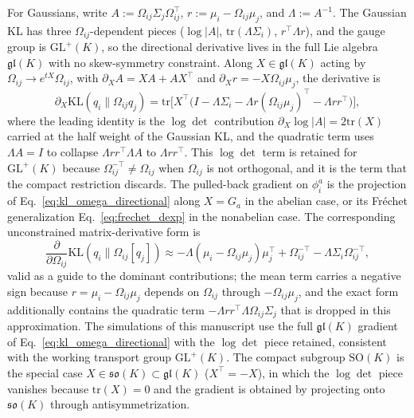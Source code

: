 \documentclass[11pt]{article}
\begin{document}
For Gaussians, write $A := \Omega_{ij}\Sigma_j\Omega_{ij}^\top$, $r := \mu_i - \Omega_{ij}\mu_j$, and $\Lambda := A^{-1}$. The Gaussian KL has three $\Omega_{ij}$-dependent pieces ($\log|A|$, $\mathrm{tr}(\Lambda\Sigma_i)$, $r^\top\Lambda r$), and the gauge group is $\mathrm{GL}^+(K)$, so the directional derivative lives in the full Lie algebra $\mathfrak{gl}(K)$ with no skew-symmetry constraint. Along $X \in \mathfrak{gl}(K)$ acting by $\Omega_{ij} \to e^{tX}\Omega_{ij}$, with $\partial_X A = XA + AX^\top$ and $\partial_X r = -X\Omega_{ij}\mu_j$, the derivative is
\begin{equation}
\partial_X\mathrm{KL}(q_i\|\Omega_{ij}q_j) = \mathrm{tr}\Big[X^\top\Big(I - \Lambda\Sigma_i - \Lambda r(\Omega_{ij}\mu_j)^\top - \Lambda r r^\top\Big)\Big],
\label{eq:kl_omega_directional}
\end{equation}
where the leading identity is the $\log\det$ contribution $\partial_X\log|A| = 2\mathrm{tr}(X)$ carried at the half weight of the Gaussian KL, and the quadratic term uses $\Lambda A = I$ to collapse $\Lambda r r^\top\Lambda A$ to $\Lambda r r^\top$. This $\log\det$ term is retained for $\mathrm{GL}^+(K)$ because $\Omega_{ij}^{-\top} \neq \Omega_{ij}$ when $\Omega_{ij}$ is not orthogonal, and it is the term that the compact restriction discards. The pulled-back gradient on $\phi_i^a$ is the projection of Eq.~\eqref{eq:kl_omega_directional} along $X = G_a$ in the abelian case, or its Fr\'echet generalization Eq.~\eqref{eq:frechet_dexp} in the nonabelian case. The corresponding unconstrained matrix-derivative form is
\begin{equation}
\frac{\partial}{\partial \Omega_{ij}}\mathrm{KL}(q_i \| \Omega_{ij}[q_j]) \approx -\Lambda(\mu_i - \Omega_{ij}\mu_j)\mu_j^\top + \Omega_{ij}^{-\top} - \Lambda \Sigma_i \Omega_{ij}^{-\top},
\label{eq:kl_omega_unconstrained}
\end{equation}
valid as a guide to the dominant contributions; the mean term carries a negative sign because $r = \mu_i - \Omega_{ij}\mu_j$ depends on $\Omega_{ij}$ through $-\Omega_{ij}\mu_j$, and the exact form additionally contains the quadratic term $-\Lambda r r^\top\Lambda\Omega_{ij}\Sigma_j$ that is dropped in this approximation. The simulations of this manuscript use the full $\mathfrak{gl}(K)$ gradient of Eq.~\eqref{eq:kl_omega_directional} with the $\log\det$ piece retained, consistent with the working transport group $\mathrm{GL}^+(K)$. The compact subgroup $\mathrm{SO}(K)$ is the special case $X \in \mathfrak{so}(K) \subset \mathfrak{gl}(K)$ ($X^\top = -X$), in which the $\log\det$ piece vanishes because $\mathrm{tr}(X) = 0$ and the gradient is obtained by projecting onto $\mathfrak{so}(K)$ through antisymmetrization.
\end{document}
